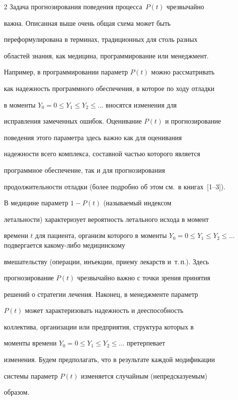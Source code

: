 \begin{multicols}{2}
Задача прогнозирования поведения процесса~$P(t)$ чрезвычайно


важна. Описанная выше очень общая схема может быть


переформулирована в терминах, традиционных для столь разных


областей знания, как медицина, программирование или менеджмент.


Например, в программировании параметр $P(t)$ можно рассматривать


как надежность программного обеспечения, в которое по ходу отладки


в моменты $Y_0=0\le Y_1\le Y_2\le\ldots$ вносятся изменения для


исправления замеченных ошибок. Оценивание $P(t)$ и прогнозирование


поведения этого параметра здесь важно как для оценивания


надежности всего комплекса, составной частью которого является


программное обеспечение, так и для прогнозирования


продолжительности отладки (более подробно об этом см.\ в книгах~[1--3]).


В медицине параметр $1-P(t)$ (называемый индексом


летальности) характеризует вероятность летального исхода в момент


времени $t$ для пациента, организм которого в моменты $Y_0=0\le


Y_1\le Y_2\le\ldots$ подвергается какому-либо медицинскому


вмешательству (операции, инъекции, приему лекарств и~т.\,п.). Здесь


прогнозирование $P(t)$ чрезвычайно важно с точки зрения принятия


решений о стратегии лечения. Наконец, в менеджменте параметр


$P(t)$ может характеризовать надежность и дееспособность


коллектива, организации или предприятия, структура которых в


моменты времени $Y_0=0\le Y_1\le Y_2\le\ldots$ претерпевает


изменения. Будем предполагать, что в результате каждой модификации


системы параметр $P(t)$ изменяется случайным (не\-пред\-ска\-зу\-емым)


образом.






\end{multicols}
